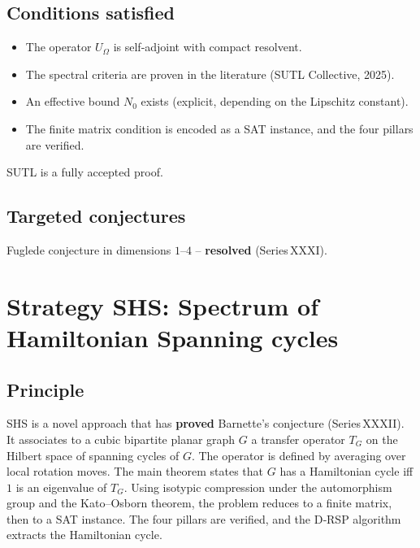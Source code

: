 \documentclass[11pt,a4paper]{article}
\begin{document}
\subsection{Conditions satisfied}
\begin{itemize}
\item The operator \(U_\Omega\) is self‑adjoint with compact resolvent.
\item The spectral criteria are proven in the literature (SUTL Collective, 2025).
\item An effective bound \(N_0\) exists (explicit, depending on the Lipschitz constant).
\item The finite matrix condition is encoded as a SAT instance, and the four pillars are verified.
\end{itemize}
SUTL is a fully accepted proof.

\subsection{Targeted conjectures}
Fuglede conjecture in dimensions \(1\)–\(4\) – \textbf{resolved} (Series XXXI).

\section{Strategy SHS: Spectrum of Hamiltonian Spanning cycles}

\subsection{Principle}
SHS is a novel approach that has \textbf{proved} Barnette's conjecture (Series XXXII). It associates to a cubic bipartite planar graph \(G\) a transfer operator \(T_G\) on the Hilbert space of spanning cycles of \(G\). The operator is defined by averaging over local rotation moves. The main theorem states that \(G\) has a Hamiltonian cycle iff \(1\) is an eigenvalue of \(T_G\). Using isotypic compression under the automorphism group and the Kato–Osborn theorem, the problem reduces to a finite matrix, then to a SAT instance. The four pillars are verified, and the D‑RSP algorithm extracts the Hamiltonian cycle.
\end{document}

